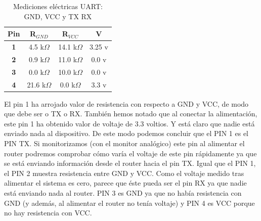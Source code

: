 \documentclass[12pt,a4paper, brazil]{article}
\begin{document}
\begin{table}[htpb]
\centering
\caption{Mediciones eléctricas UART: GND, VCC y TX RX}
\label{tab:my-table}
\begin{tabular}{@{}cccc@{}}
\toprule
{\color[HTML]{FE0000} \textbf{Pin}} & {\color[HTML]{FE0000} \textbf{R$_{GND}$}}                 & {\color[HTML]{FE0000} \textbf{R$_{VCC}$}}                 & {\color[HTML]{FE0000} \textbf{V}} \\ \midrule
\multicolumn{1}{|c|}{\textbf{1}}    & \multicolumn{1}{c|}{4.5 k$\Omega$}                        & \multicolumn{1}{c|}{14.1 k$\Omega$}                       & \multicolumn{1}{c|}{3.25 v}       \\ \midrule
\multicolumn{1}{|c|}{\textbf{2}}    & \multicolumn{1}{c|}{0.9 k$\Omega$}                        & \multicolumn{1}{c|}{11.0 k$\Omega$}                       & \multicolumn{1}{c|}{0.0 v}        \\ \midrule
\multicolumn{1}{|c|}{\textbf{3}}    & \multicolumn{1}{c|}{{\color[HTML]{FE0000} 0.0 k$\Omega$}} & \multicolumn{1}{c|}{10.0 k$\Omega$}                       & \multicolumn{1}{c|}{0.0 v}        \\ \midrule
\multicolumn{1}{|c|}{\textbf{4}}    & \multicolumn{1}{c|}{21.6 k$\Omega$}                       & \multicolumn{1}{c|}{{\color[HTML]{FE0000} 0.0 k$\Omega$}} & \multicolumn{1}{c|}{3.3 v}        \\ \bottomrule
\end{tabular}
\end{table}

El pin 1 ha arrojado valor de resistencia con respecto a GND y VCC, de modo que debe ser o TX o RX. También hemos notado que al conectar la alimentación, este pin 1 ha obtenido valor de voltaje de 3.3 voltios. Y está claro que nadie está enviado nada al dispositivo. De este modo podemos concluir que el PIN 1 es el PIN TX. Si monitorizamos (con el monitor analógico) este pin al alimentar el router podremos comprobar cómo varía el voltaje de este pin rápidamente ya que se está enviando información desde el router hacia el pin TX. Igual que el PIN 1, el PIN 2 muestra resistencia entre GND y VCC. Como el voltaje medido tras alimentar el sistema es cero, parece que éste pueda ser el pin RX ya que nadie está enviando nada al router. PIN 3 es GND ya que no había resistencia con GND (y además, al alimentar el router no tenía voltaje) y PIN 4 es VCC porque no hay resistencia con VCC. 
\end{document}
